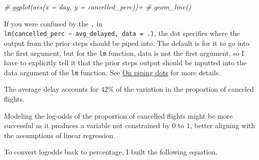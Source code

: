 \documentclass[]{book}
\newenvironment{Shaded}{\begin{snugshade}}{\end{snugshade}}
\newcommand{\CommentTok}[1]{\textcolor[rgb]{0.56,0.35,0.01}{\textit{#1}}}
\newcommand{\DataTypeTok}[1]{\textcolor[rgb]{0.13,0.29,0.53}{#1}}
\newcommand{\KeywordTok}[1]{\textcolor[rgb]{0.13,0.29,0.53}{\textbf{#1}}}
\newcommand{\NormalTok}[1]{#1}
\newcommand{\OperatorTok}[1]{\textcolor[rgb]{0.81,0.36,0.00}{\textbf{#1}}}
\newcommand{\OtherTok}[1]{\textcolor[rgb]{0.56,0.35,0.01}{#1}}
\newcommand{\StringTok}[1]{\textcolor[rgb]{0.31,0.60,0.02}{#1}}
\theoremstyle{definition}
\theoremstyle{definition}
\theoremstyle{definition}
\theoremstyle{remark}
\begin{document}
\begin{Shaded}
\begin{Highlighting}[]
  \CommentTok{# ggplot(aes(x = day, y = cancelled_perc))+}
  \CommentTok{# geom_line()}
\end{Highlighting}
\end{Shaded}

If you were confused by the \texttt{.} in
\texttt{lm(cancelled\_perc\ \textasciitilde{}\ avg\_delayed,\ data\ =\ .)},
the dot specifies where the output from the prior steps should be piped
into. The default is for it to go into the first argument, but for the
\texttt{lm} function, data is not the first argument, so I have to
explicitly tell it that the prior steps output should be inputted into
the data argument of the \texttt{lm} function. See
\protect\hyperlink{on-piping-dots}{On piping dots} for more details.

The average delay accounts for 42\% of the variation in the proportion
of canceled flights.

Modeling the log-odds of the proportion of cancelled flights might be
more successful as it produces a variable not constrained by 0 to 1,
better aligning with the assumptions of linear regression.

\begin{Shaded}
\end{Shaded}

To convert logodds back to percentage, I built the following equation.
\end{document}

